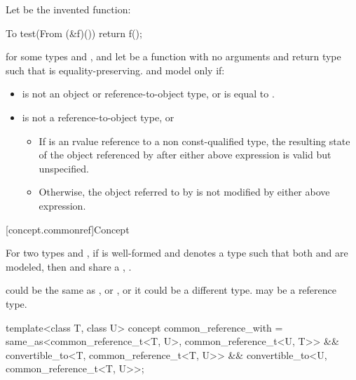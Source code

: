 \begin{itemdescr}
\pnum
Let  be the invented function:
\begin{codeblock}
To test(From (&f)()) {
  return f();
}
\end{codeblock}
for some types  and ,
and let  be a function with no arguments and return type 
such that  is equality-preserving.
 and  model 
only if:

\begin{itemize}
\item
{} is not an object or reference-to-object type, or
 is equal to .

\item
{} is not a reference-to-object type, or

\begin{itemize}
\item
If  is an rvalue reference to a non const-qualified type, the
resulting state of the object referenced by  after either above
expression is valid but unspecified.

\item
Otherwise, the object referred to by  is not modified by either above
expression.
\end{itemize}
\end{itemize}
\end{itemdescr}


[concept.commonref]{Concept }

\pnum
For two types  and , if 
is well-formed and denotes a type  such that both
and
are modeled, then  and  share a
, .
\begin{note}
 could be the same as , or , or it could be a
different type.  may be a reference type.
\end{note}

%
\begin{itemdecl}
template<class T, class U>
  concept common_reference_with =
    same_as<common_reference_t<T, U>, common_reference_t<U, T>> &&
    convertible_to<T, common_reference_t<T, U>> &&
    convertible_to<U, common_reference_t<T, U>>;
\end{itemdecl}

